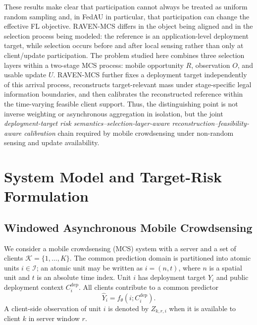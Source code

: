 \documentclass[letterpaper,journal]{IEEEtran}
\begin{document}
These results make clear that participation cannot always be treated as
uniform random sampling and, in FedAU in particular, that participation can
change the effective FL objective.  RAVEN-MCS differs in the object being
aligned and in the selection process being modeled: the reference is an
application-level deployment target, while selection occurs before and after
local sensing rather than only at client/update participation.  The problem
studied here combines three selection layers within a two-stage MCS process:
mobile opportunity $R$, observation $O$, and usable update $U$.  RAVEN-MCS
further fixes a deployment target independently of this arrival process,
reconstructs target-relevant mass under stage-specific legal information
boundaries, and then calibrates the reconstructed reference within the
time-varying feasible client support.  Thus, the distinguishing point is not
inverse weighting or asynchronous aggregation in isolation, but the joint
\emph{deployment-target risk semantics--selection-layer-aware
reconstruction--feasibility-aware calibration} chain required by mobile
crowdsensing under non-random sensing and update availability.


\section{System Model and Target-Risk Formulation}
\label{sec:system_model}

\subsection{Windowed Asynchronous Mobile Crowdsensing}
\label{subsec:windowed_mcs}

We consider a mobile crowdsensing (MCS) system with a server and a set of
clients $\mathcal{K}=\{1,\ldots,K\}$.  The common prediction domain is
partitioned into atomic units $i\in\mathcal{I}$; an atomic unit may be written as
$i=(n,t)$, where $n$ is a spatial unit and $t$ is an absolute time index.  Unit
$i$ has deployment target $Y_i$ and public deployment context
$C_i^{\mathrm{dep}}$.  All clients contribute to a common predictor
\begin{equation}
    \widehat Y_i=f_{\theta}(i;C_i^{\mathrm{dep}}).
    \label{eq:common_predictor}
\end{equation}
A client-side observation of unit $i$ is denoted by $Z_{k,r,i}$ when it is
available to client $k$ in server window $r$.
\end{document}
